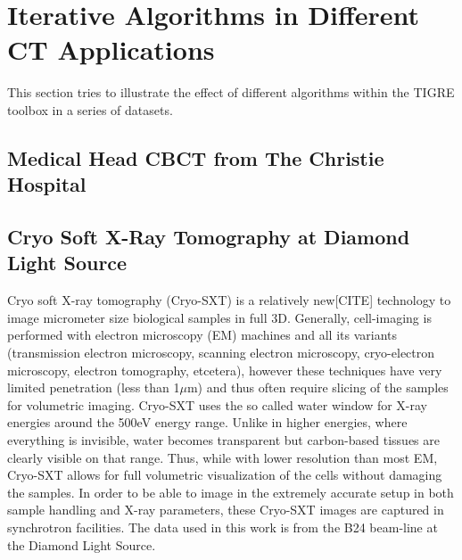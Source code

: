 \FloatBarrier
\section{Iterative Algorithms in Different CT Applications}
This section tries to illustrate the effect of different algorithms within the TIGRE toolbox in a series of datasets. 
\subsection{Medical Head CBCT from  The Christie Hospital}
\subsection{Cryo Soft X-Ray Tomography at Diamond Light Source}

Cryo soft X-ray tomography (Cryo-SXT) is a relatively new[CITE] technology to image micrometer size biological samples in full 3D. Generally, cell-imaging is performed with electron microscopy (EM) machines and all its variants (transmission electron microscopy, scanning electron microscopy, cryo-electron microscopy, electron tomography, etcetera), however these techniques have very limited penetration (less than 1$\mu$m) and thus often require slicing of the samples for volumetric imaging. Cryo-SXT uses the so called water window for X-ray energies around the 500eV energy range. Unlike in higher energies, where everything is invisible, water becomes transparent but carbon-based tissues are clearly visible on that range. Thus, while with lower resolution than most EM, Cryo-SXT allows for full volumetric visualization of the cells without damaging the samples. In order to be able to image in the extremely accurate setup in both sample handling and X-ray parameters, these Cryo-SXT images are captured in synchrotron facilities. The data used in this work is from the B24 beam-line at the Diamond Light Source.

